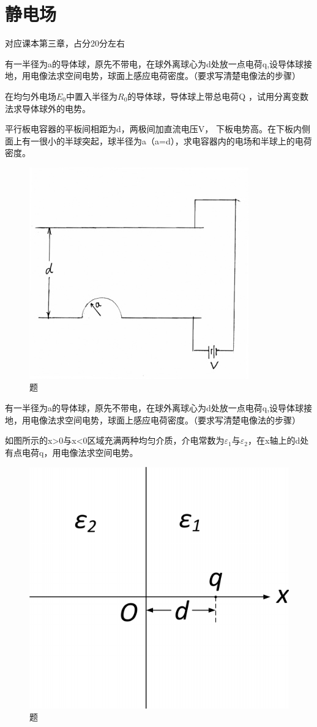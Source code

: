 \section{静电场}
对应课本第三章，占分20分左右

\begin{question}
有一半径为a的导体球，原先不带电，在球外离球心为d处放一点电荷q,设导体球接地，用电像法求空间电势，球面上感应电荷密度。（要求写清楚电像法的步骤）
\end{question}

\begin{question}
在均匀外电场$E_0$中置入半径为$R_0$的导体球，导体球上带总电荷Q ，试用分离变数法求导体球外的电势。
\end{question}

\begin{question}
平行板电容器的平板间相距为d，两极间加直流电压V，
下板电势高。在下板内侧面上有一很小的半球突起，球半径为a（a=d），求电容器内的电场和半球上的电荷密度。
\begin{figure}[ht]
\centering
\includegraphics[height=3 cm]{images/q1_2_3.jpg}
\caption{题\thequestion}
\end{figure}

\end{question}

\begin{question}
有一半径为a的导体球，原先不带电，在球外离球心为d处放一点电荷q,设导体球接地，用电像法求空间电势，球面上感应电荷密度。（要求写清楚电像法的步骤）
\end{question}

\begin{question}
如图所示的x>0与x<0区域充满两种均匀介质，介电常数为$\varepsilon_1$与$\varepsilon_2$，在x轴上的d处有点电荷q，用电像法求空间电势。
\begin{figure}[ht]
\centering
\includegraphics[height=3 cm]{images/q1_2_5.png}
\caption{题\thequestion}
\end{figure}
\end{question}

